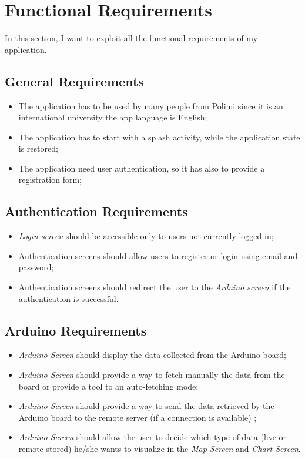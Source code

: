 \section{Functional Requirements}
In this section, I want to exploit all the functional requirements of my application.

\subsection{General Requirements}
\begin{itemize}
    \item The application has to be used by many people from Polimi since it is an international university the app language is English;
    \item The application has to start with a splash activity, while the application state is restored;
    \item The application need user authentication, so it has also to provide a registration form;
\end{itemize}

\subsection{Authentication Requirements}
\begin{itemize}
    \item \textit{Login screen} should be accessible only to users not currently logged in;
    \item Authentication screens should allow users to register or login using email and password;
    \item Authentication screens should redirect the user to the \textit{Arduino screen} if the authentication is successful.
\end{itemize}
    
\subsection{Arduino Requirements}
\begin{itemize}
    \item \textit{Arduino Screen} should display the data collected from the Arduino board;
    \item \textit{Arduino Screen} should provide a way to fetch manually the data from the board or provide a tool to an auto-fetching mode;
    \item \textit{Arduino Screen} should provide a way to send the data retrieved by the Arduino board to the remote server (if a connection is available) ;
    \item \textit{Arduino Screen} should allow the user to decide which type of data (live or remote stored) he/she wants to visualize in the \textit{Map Screen} and \textit{Chart Screen}.
\end{itemize}
    
